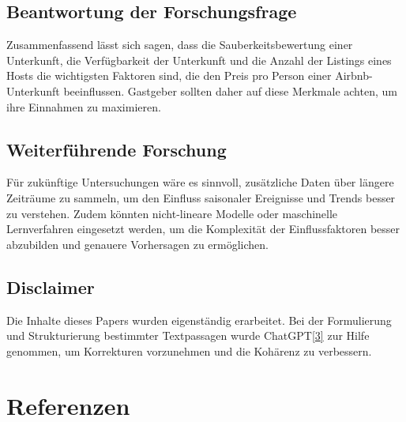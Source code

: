 \documentclass[
  journal,
]{IEEEtran}%
\begin{document}
\hypertarget{beantwortung-der-forschungsfrage}{%
\subsection{Beantwortung der
Forschungsfrage}\label{beantwortung-der-forschungsfrage}}

Zusammenfassend lässt sich sagen, dass die Sauberkeitsbewertung einer
Unterkunft, die Verfügbarkeit der Unterkunft und die Anzahl der Listings
eines Hosts die wichtigsten Faktoren sind, die den Preis pro Person
einer Airbnb-Unterkunft beeinflussen. Gastgeber sollten daher auf diese
Merkmale achten, um ihre Einnahmen zu maximieren.

\hypertarget{weiterfuxfchrende-forschung}{%
\subsection{Weiterführende
Forschung}\label{weiterfuxfchrende-forschung}}

Für zukünftige Untersuchungen wäre es sinnvoll, zusätzliche Daten über
längere Zeiträume zu sammeln, um den Einfluss saisonaler Ereignisse und
Trends besser zu verstehen. Zudem könnten nicht-lineare Modelle oder
maschinelle Lernverfahren eingesetzt werden, um die Komplexität der
Einflussfaktoren besser abzubilden und genauere Vorhersagen zu
ermöglichen.

\hypertarget{disclaimer}{%
\subsection{Disclaimer}\label{disclaimer}}

Die Inhalte dieses Papers wurden eigenständig erarbeitet. Bei der
Formulierung und Strukturierung bestimmter Textpassagen wurde
ChatGPT\protect\hyperlink{ref-openai-2022}{{[}3{]}} zur Hilfe genommen,
um Korrekturen vorzunehmen und die Kohärenz zu verbessern.

\hypertarget{referenzen}{%
\section*{Referenzen}\label{referenzen}}
\end{document}
